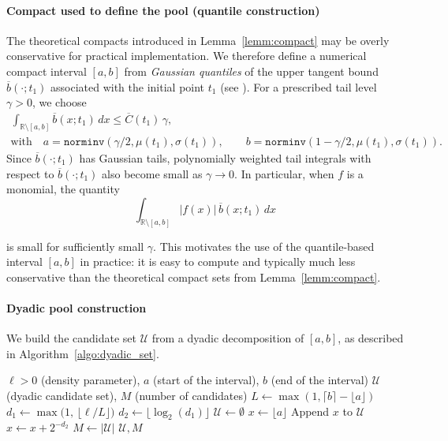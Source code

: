 \documentclass[review]{elsarticle}
\begin{document}
\paragraph{Compact used to define the pool (quantile construction)}
The theoretical compacts introduced in Lemma~\ref{lemm:compact} may be overly conservative for practical implementation. We therefore define a numerical compact interval $[a,b]$ from \emph{Gaussian quantiles} of the upper tangent bound $\overline b(\cdot;t_1)$ associated with the initial point $t_1$ (see \cite{abramowitz1972handbook, MATLABnorminv2025}). For a prescribed tail level $\gamma>0$, we choose
\begin{multline}
\label{eq_ab}
\int_{\mathbb R\setminus[a,b]} \overline b(x;t_1)\,dx \le \overline C(t_1)\,\gamma,\\
\text{with}\quad
a=\texttt{norminv}(\gamma/2,\mu(t_1),\sigma(t_1)),
\qquad
b=\texttt{norminv}(1-\gamma/2,\mu(t_1),\sigma(t_1)).
\end{multline}
Since $\overline b(\cdot;t_1)$ has Gaussian tails, polynomially weighted tail integrals with respect to $\overline b(\cdot;t_1)$ also become small as $\gamma\to 0$. In particular, when $f$ is a monomial, the quantity
$$
\int_{\mathbb R\setminus[a,b]} |f(x)|\,\overline b(x;t_1)\,dx
$$

is small for sufficiently small $\gamma$. This motivates the use of the quantile-based interval $[a,b]$ in practice: it is easy to compute and typically much less conservative than the theoretical compact sets from Lemma~\ref{lemm:compact}.

\paragraph{Dyadic pool construction}
We build the candidate set $\mathcal U$ from a dyadic decomposition of $[a,b]$, as described in Algorithm~\ref{algo:dyadic_set}.

\begin{algorithm}[H]
\caption{Dyadic Set Construction}
\label{algo:dyadic_set}
\begin{algorithmic}[1]
\Require $\ell>0$ (density parameter), $a$ (start of the interval), $b$ (end of the interval)
\Ensure $\mathcal{U}$ (dyadic candidate set), $M$ (number of candidates)
\State $L \gets \max(1,\lceil b \rceil - \lfloor a \rfloor)$ 
\State $d_1 \gets \max\bigl(1,\, \lfloor \ell / L \rfloor \bigr)$ 
\State $d_2 \gets \lfloor \log_2(d_1) \rfloor$ 
\State $\mathcal{U} \gets \emptyset$
\State $x \gets \lfloor a \rfloor$
    \State Append $x$ to $\mathcal{U}$
    \State $x \gets x + 2^{-d_2}$ 
\EndWhile
\State $M \gets |\mathcal{U}|$
\State \Return $\mathcal{U}, M$
\end{algorithmic}
\end{algorithm}
\end{document}
